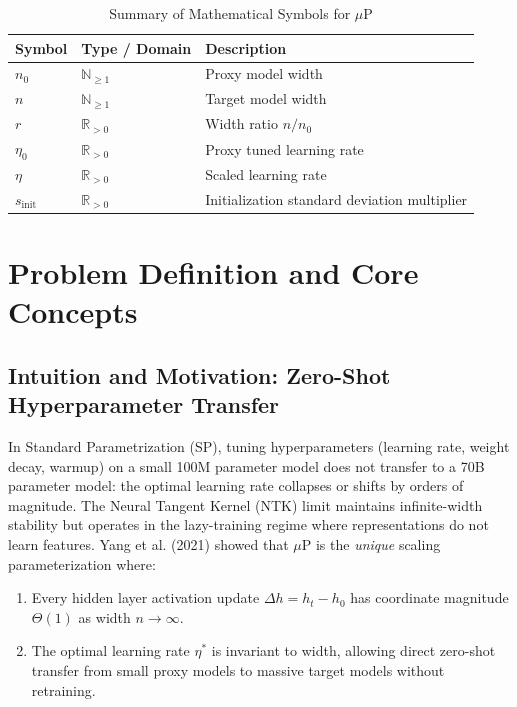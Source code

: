 \documentclass[11pt,a4paper]{article}
\theoremstyle{definition}
\begin{document}
\begin{table}[h]
\centering
\caption{Summary of Mathematical Symbols for $\mu\text{P}$}
\begin{tabular}{lll}
\toprule
\textbf{Symbol} & \textbf{Type / Domain} & \textbf{Description} \\
\midrule
$n_0$ & $\mathbb{N}_{\ge 1}$ & Proxy model width \\
$n$ & $\mathbb{N}_{\ge 1}$ & Target model width \\
$r$ & $\mathbb{R}_{> 0}$ & Width ratio $n / n_0$ \\
$\eta_0$ & $\mathbb{R}_{> 0}$ & Proxy tuned learning rate \\
$\eta$ & $\mathbb{R}_{> 0}$ & Scaled learning rate \\
$s_{\text{init}}$ & $\mathbb{R}_{> 0}$ & Initialization standard deviation multiplier \\
\bottomrule
\end{tabular}
\end{table}

\section{Problem Definition and Core Concepts}

\subsection{Intuition and Motivation: Zero-Shot Hyperparameter Transfer}
In Standard Parametrization (SP), tuning hyperparameters (learning rate, weight decay, warmup) on a small 100M parameter model does not transfer to a 70B parameter model: the optimal learning rate collapses or shifts by orders of magnitude. The Neural Tangent Kernel (NTK) limit maintains infinite-width stability but operates in the lazy-training regime where representations do not learn features. Yang et al. (2021) showed that $\mu\text{P}$ is the \textit{unique} scaling parameterization where:
\begin{enumerate}
    \item Every hidden layer activation update $\Delta h = h_t - h_0$ has coordinate magnitude $\Theta(1)$ as width $n \to \infty$.
    \item The optimal learning rate $\eta^*$ is invariant to width, allowing direct zero-shot transfer from small proxy models to massive target models without retraining.
\end{enumerate}
\end{document}
